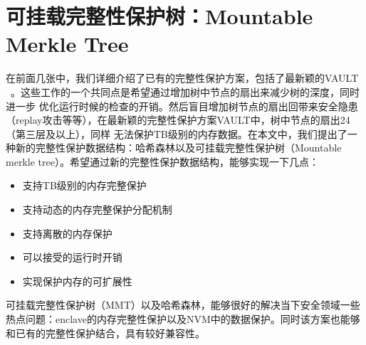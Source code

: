 \chapter{可挂载完整性保护树：Mountable Merkle Tree}

在前面几张中，我们详细介绍了已有的完整性保护方案，包括了最新颖的VAULT ~\cite{taassori2018vault}。这些工作的一个共同点是希望通过增加树中节点的扇出来减少树的深度，同时进一步
优化运行时候的检查的开销。然后盲目增加树节点的扇出回带来安全隐患（replay攻击等等），在最新颖的完整性保护方案VAULT中，树中节点的扇出24（第三层及以上），同样
无法保护TB级别的内存数据。在本文中，我们提出了一种新的完整性保护数据结构：哈希森林以及可挂载完整性保护树（Mountable merkle tree）。希望通过新的完整性保护数据结构，能够实现一下几点：
\begin{itemize}
    \item 支持TB级别的内存完整保护
    \item 支持动态的内存完整保护分配机制
    \item 支持离散的内存保护
    \item 可以接受的运行时开销
    \item 实现保护内存的可扩展性
\end{itemize}
可挂载完整性保护树（MMT）以及哈希森林，能够很好的解决当下安全领域一些热点问题：enclave的内存完整性保护以及NVM中的数据保护。同时该方案也能够和已有的完整性保护结合，具有较好兼容性。

